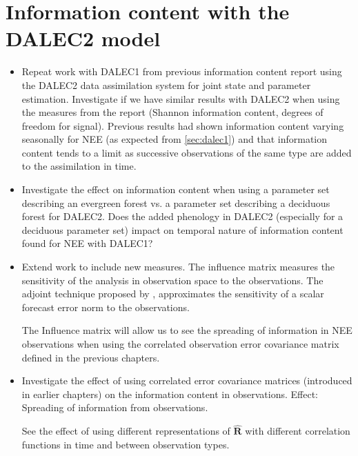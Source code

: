 \documentclass[11pt]{article}
\begin{document}
\section{Information content with the DALEC2 model}
\begin{itemize}
\item Repeat work with DALEC1 from previous information content report using the DALEC2 data assimilation system for joint state and parameter estimation. Investigate if we have similar results with DALEC2 when using the measures from the report (Shannon information content, degrees of freedom for signal). Previous results had shown information content varying seasonally for NEE (as expected from \ref{sec:dalec1}) and that information content tends to a limit as successive observations of the same type are added to the assimilation in time. 

\item Investigate the effect on information content when using a parameter set describing an evergreen forest vs. a parameter set describing a deciduous forest for DALEC2. Does the added phenology in DALEC2 (especially for a deciduous parameter set) impact on temporal nature of information content found for NEE with DALEC1? 

\item Extend work to include new measures. The \citet{Cardinali2004} influence matrix measures the sensitivity of the analysis in observation space to the observations. The adjoint technique proposed by \citet{Langland2004}, approximates the sensitivity of a scalar forecast error norm to the observations. 

The Influence matrix will allow us to see the spreading of information in NEE observations when using the correlated observation error covariance matrix defined in the previous chapters.

\item Investigate the effect of using correlated error covariance matrices (introduced in earlier chapters) on the information content in observations. Effect: Spreading of information from observations. 

See the effect of using different representations of $\hat{\textbf{R}}$ with different correlation functions in time and between observation types.
\end{itemize}
\end{document}
